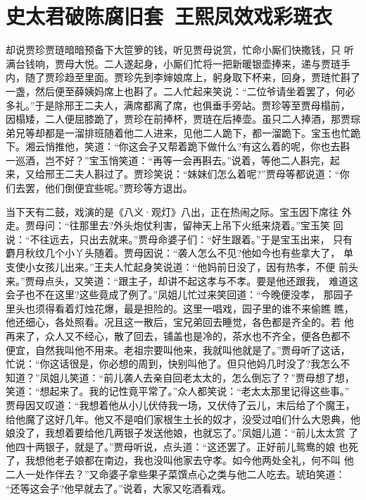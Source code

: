 \chapter{史太君破陈腐旧套~王熙凤效戏彩斑衣}

却说贾珍贾琏暗暗预备下大笸箩的钱，听见贾母说赏，忙命小厮们快撒钱，只
听满台钱响，贾母大悦。二人遂起身，小厮们忙将一把新暖银壶捧来，递与贾琏手
内，随了贾珍趋至里面。贾珍先到李婶娘席上，躬身取下杯来，回身，贾琏忙斟了
一盏，然后便至薛姨妈席上也斟了。二人忙起来笑说：“二位爷请坐着罢了，何必
多礼。”于是除邢王二夫人，满席都离了席，也俱垂手旁站。贾珍等至贾母榻前，
因榻矮，二人便屈膝跪了，贾珍在前捧杯，贾琏在后捧壶。虽只二人捧酒，那贾琮
弟兄等却都是一溜排班随着他二人进来，见他二人跪下，都一溜跪下。宝玉也忙跪
下。湘云悄推他，笑道：“你这会子又帮着跪下做什么?有这么着的呢，你也去斟
一巡酒，岂不好？”宝玉悄笑道：“再等一会再斟去。”说着，等他二人斟完，起
来，又给邢王二夫人斟过了。贾珍笑说：“妹妹们怎么着呢?”贾母等都说道：“你
们去罢，他们倒便宜些呢。”贾珍等方退出。

当下天有二鼓，戏演的是《八义·观灯》八出，正在热闹之际。宝玉因下席往
外走。贾母问：“往那里去?外头炮仗利害，留神天上吊下火纸来烧着。”宝玉笑
回说：“不往远去，只出去就来。”贾母命婆子们：“好生跟着。”于是宝玉出来，
只有麝月秋纹几个小丫头随着。贾母因说：“袭人怎么不见?他如今也有些拿大了，
单支使小女孩儿出来。”王夫人忙起身笑说道：“他妈前日没了，因有热孝，不便
前头来。”贾母点头，又笑道：“跟主子，却讲不起这孝与不孝。要是他还跟我，
难道这会子也不在这里?这些竟成了例了。”凤姐儿忙过来笑回道：“今晚便没孝，
那园子里头也须得看着灯烛花爆，最是担险的。这里一唱戏，园子里的谁不来偷瞧
瞧，他还细心，各处照看。况且这一散后，宝兄弟回去睡觉，各色都是齐全的。若
他再来了，众人又不经心，散了回去，铺盖也是冷的，茶水也不齐全，便各色都不
便宜，自然我叫他不用来。老祖宗要叫他来，我就叫他就是了。”贾母听了这话，
忙说：“你这话很是，你必想的周到，快别叫他了。但只他妈几时没了?我怎么不
知道？”凤姐儿笑道：“前儿袭人去亲自回老太太的，怎么倒忘了？”贾母想了想，
笑道：“想起来了。我的记性竟平常了。”众人都笑说：“老太太那里记得这些事。”
贾母因又叹道：“我想着他从小儿伏侍我一场，又伏侍了云儿，末后给了个魔王，
给他魔了这好几年。他又不是咱们家根生土长的奴才，没受过咱们什么大恩典，他
娘没了，我想着要给他几两银子发送他娘，也就忘了。”凤姐儿道：“前儿太太赏
了他四十两银子，就是了。”贾母听说，点头道：“这还罢了。正好前儿鸳鸯的娘
也死了，我想他老子娘都在南边，我也没叫他家去守孝。如今他两处全礼，何不叫
他二人一处作伴去？”又命婆子拿些果子菜馔点心之类与他二人吃去。琥珀笑道：
“还等这会子?他早就去了。”说着，大家又吃酒看戏。

